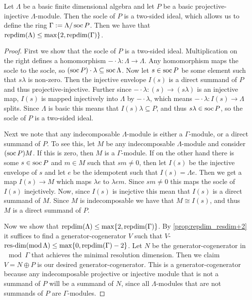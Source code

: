 \begin{theorem}
	Let $\Lambda$ be a basic finite dimensional algebra and let $P$ be a basic projective-injective $\Lambda$-module. Then the socle of $P$ is a two-sided ideal, which allows us to define the ring $\Gamma := \Lambda / \operatorname{soc} P$. Then we have that $\operatorname{repdim}(\Lambda) \leq \max\{2, \operatorname{repdim}(\Gamma)\}$. 
	\begin{proof}
		First we show that the socle of $P$ is a two-sided ideal. Multiplication on the right defines a homomorphism $-\cdot \lambda\colon \Lambda \to \Lambda$. Any homomorphism maps the socle to the socle, so $(\operatorname{soc} P) \cdot \lambda \subseteq \operatorname{soc} \Lambda$. Now let $s \in \operatorname{soc} P$ be some element such that $s\lambda$ is non-zero. Then the injective envelope $I(s)$ is a direct summand of $P$ and thus projective-injective. Further since $-\cdot \lambda\colon (s) \to (s\lambda)$ is an injective map, $I(s)$ is mapped injectively into $\Lambda$ by $-\cdot \lambda$, which means $-\cdot\lambda\colon I(s) \to \Lambda$ splits. Since $\Lambda$ is basic this means that $I(s)\lambda \subseteq P$, and thus $s\lambda \in \operatorname{soc} P$, so the socle of $P$ is a two-sided ideal.
		
		Next we note that any indecomposable $\Lambda$-module is either a $\Gamma$-module, or a direct summand of $P$. To see this, let $M$ be any indecomposable $\Lambda$-module and consider $(\operatorname{soc} P)M$. If this is zero, then $M$ is a $\Gamma$-module. If on the other hand there is some $s \in \operatorname{soc} P$ and $m \in M$ such that $sm \neq 0$, then let $I(s)$ be the injective envelope of $s$ and let $e$ be the idempotent such that $I(s) = \Lambda e$. Then we get a map $I(s) \to M$ which maps $\lambda e$ to $\lambda e m$. Since $sm \neq 0$ this maps the socle of $I(s)$ inejctively. Now, since $I(s)$ is inejctive this mean that $I(s)$ is a direct summand of $M$. Since $M$ is indecomposable we have that $M \cong I(s)$, and thus $M$ is a direct summand of $P$.
		
		Now we show that $\operatorname{repdim}(\Lambda) \leq \max\{2, \operatorname{repdim}(\Gamma)\}$. By \cref{prop:repdim_resdim+2} it suffices to find a generator-cogenerator $V$ such that $V$-$\operatorname{res-dim}(\operatorname{mod} \Lambda) \leq \max\{0, \operatorname{repdim}(\Gamma)-2\}$. Let $N$ be the generator-cogenerator in $\mod\Gamma$ that achieves the minimal resolution dimension. Then we claim $V = N \oplus P$ is our desired generator-cogenerator. This is a generator-cogenerator because any indecomposable projective or injective module that is not a summand of $P$ will be  a summand of $N$, since all $\Lambda$-modules that are not summands of $P$ are $\Gamma$-modules.
		

\end{proof}
\end{theorem}
